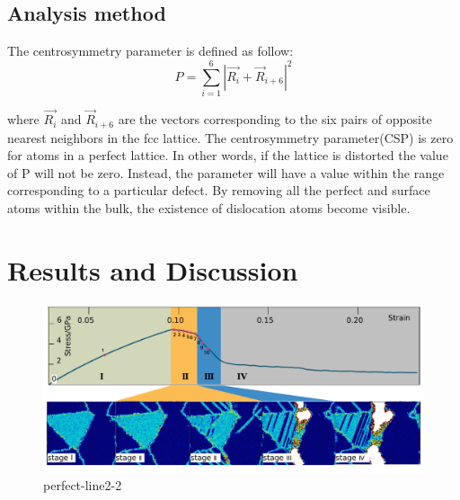 \documentclass[journal,article,submit,moreauthors,pdftex,10pt,a4paper]{Definitions/mdpi}
\begin{document}
	

	\subsection{Analysis method}
	The centrosymmetry parameter is defined as follow:
	\begin{equation} \label{eq:csp} 
	P = \displaystyle\sum_{i=1}^{6}|\vec{R_i}+{\vec{R}}_{i+6}|^2
	\end{equation}
	
where $\vec{R_i}$ and ${\vec{R}}_{i+6}$ are the vectors corresponding to the six pairs of opposite nearest neighbors in the fcc lattice. The centrosymmetry parameter(CSP) is zero for atoms in a perfect lattice. In other words, if the lattice is distorted the value of P will not be zero. Instead, the parameter will have a value within the range corresponding to a particular defect. By removing all the perfect and surface atoms within the bulk, the existence of dislocation atoms become visible.
	

	\section{Results and Discussion}
	
	\begin{figure}[ht]
		\centering
		\includegraphics[width=1\linewidth]{img/perfect-line2-2}
		\caption{perfect-line2-2}
		\label{fig:perfect-line2-2}
	\end{figure}
\end{document}
